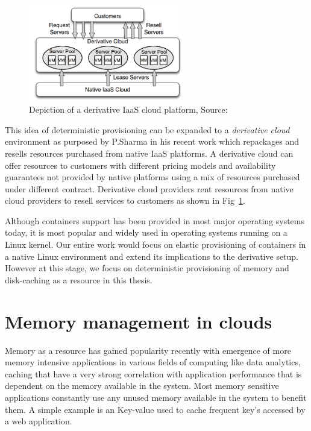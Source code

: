     \begin{figure}
      \centering
      \includegraphics[width=0.6\textwidth]{images/intro/derivative_cloud.png}
      \caption{Depiction of a derivative IaaS cloud platform, Source:\cite{sharma2015spotcheck}}
      \label{img_derivative_cloud}
    \end{figure}

    This idea of deterministic provisioning can be expanded to a \textit{derivative cloud} environment as purposed by P.Sharma in his 
recent work \cite{sharma2015spotcheck} which repackages and resells resources purchased from native IaaS platforms. A derivative cloud can 
offer resources to customers with different pricing models and availability guarantees not provided by native platforms using a mix of 
resources purchased under different contract. Derivative cloud providers rent resources from native cloud providers to resell services to 
customers as shown in Fig~\ref{img_derivative_cloud}.

    Although containers support has been provided in most major operating systems today, it is most popular and widely used in operating 
systems running on a Linux kernel. Our entire work would focus on elastic provisioning of containers in a native Linux environment and 
extend its implications to the derivative setup. However at this stage, we focus on deterministic provisioning of memory and disk-caching 
as a resource in this thesis.

  \section{Memory management in clouds}
  
    Memory as a resource has gained popularity recently with emergence of more memory intensive applications in various fields of 
computing like data analytics, caching that have a very strong correlation with application performance that is dependent on the memory 
available in the system. Most memory sensitive applications constantly use any unused memory available in the system to benefit them. A 
simple example is an Key-value used to cache frequent key's accessed by a web application. 


